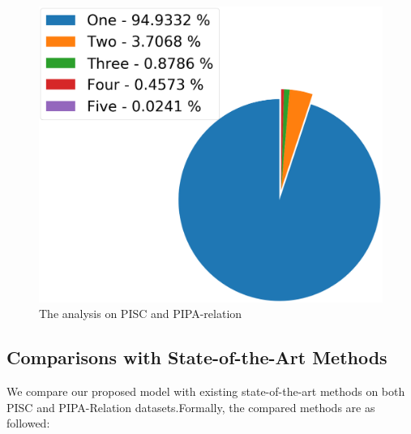 \documentclass{article}
\begin{document}
\begin{figure}[htpb]
{    \begin{minipage}[t]{0.45\linewidth}
      \centering
      \includegraphics[width=1\linewidth]{pic/PIPA_fine.png}
    \end{minipage}
  }
  \caption{The analysis on PISC and PIPA-relation}
  \label{fig:dataset_analysis}
\end{figure}

\subsection{Comparisons with State-of-the-Art Methods}

We compare our proposed model with existing state-of-the-art methods on both PISC and PIPA-Relation datasets.Formally, the compared methods are as followed:
\end{document}
